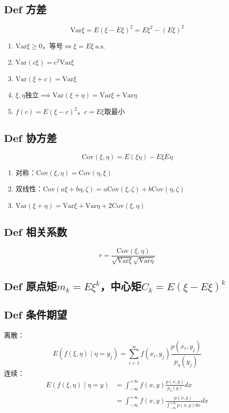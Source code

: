 \documentclass{article}
\begin{document}
	\subsection{$\bm{Def}$ 方差}
	\[
	\mathrm{Var}\xi=E(\xi-E\xi)^2=E\xi^2-(E\xi)^2
	\]
	\begin{enumerate}
		\item $\mathrm{Var}\xi\ge0$，等号$\iff\xi=E\xi\ \text{a.s.}$
		\item $\mathrm{Var}(c\xi)=c^2\mathrm{Var}\xi$
		\item $\mathrm{Var}(\xi+c)=\mathrm{Var}\xi$
		\item $\xi,\eta$独立$\implies\mathrm{Var}(\xi+\eta)=\mathrm{Var}\xi+\mathrm{Var}\eta$
		\item $f(c)=E(\xi-c)^2$，$c=E\xi$取最小
	\end{enumerate}
	\subsection{$\bm{Def}$ 协方差}
	\[
	\mathrm{Cov}(\xi,\eta)=E(\xi\eta)-E\xi E\eta
	\]
	\begin{enumerate}
		\item 对称：$\mathrm{Cov}(\xi,\eta)=\mathrm{Cov}(\eta,\xi)$
		\item 双线性：$\mathrm{Cov}(a\xi+b\eta,\zeta)=a\mathrm{Cov}(\xi,\zeta)+b\mathrm{Cov}(\eta,\zeta)$
		\item $\mathrm{Var}(\xi+\eta)=\mathrm{Var}\xi+\mathrm{Var}\eta+2\mathrm{Cov}(\xi,\eta)$
	\end{enumerate}
	\subsection{$\bm{Def}$ 相关系数}
	\[
	r=\frac{\mathrm{Cov}(\xi,\eta)}{\sqrt{\mathrm{Var}\xi}\sqrt{\mathrm{Var}\eta}}
	\]
	\subsection{$\bm{Def}$ 原点矩$m_k=E\xi^k$，中心矩$C_k=E(\xi-E\xi)^k$}
	\subsection{$\bm{Def}$ 条件期望}
	离散：
	\[
	E(f(\xi,\eta)\mid\eta=y_j)=\sum_{i=1}^{\infty}f(x_i,y_j)\frac{p(x_i,y_j)}{p_{\eta}(y_j)}
	\]
	连续：
	\begin{align}
	\displaystyle E(f(\xi,\eta)\mid\eta=y)&=\int_{-\infty}^{+\infty}f(x,y)\frac{p(x,y)}{p_{\eta}(y)}dx\\
	&=\int_{-\infty}^{+\infty}f(x,y)\frac{p(x,y)}{\int_{-\infty}^{+\infty} p(x,y)dx}dx
	\end{align}
\end{document}
